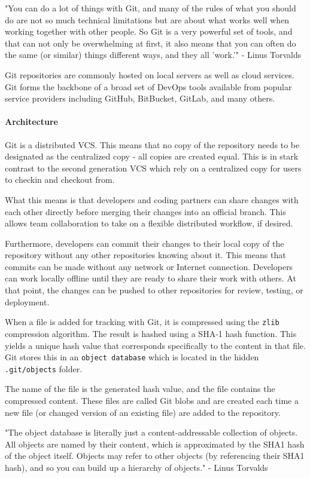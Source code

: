 "You can do a lot of things with Git, and many of the rules of what you should do are not so much technical limitations but are about what works well when working together with other people. So Git is a very powerful set of tools, and that can not only be overwhelming at first, it also means that you can often do the same (or similar) things different ways, and they all 'work.'" - Linus Torvalds

Git repositories are commonly hosted on local servers as well as cloud services. Git forms the backbone of a broad set of DevOps tools available from popular service providers including GitHub, BitBucket, GitLab, and many others.
\paragraph{Architecture}
Git is a distributed VCS. This means that no copy of the repository needs to be designated as the centralized copy - all copies are created equal. This is in stark contrast to the second generation VCS which rely on a centralized copy for users to checkin and checkout from.

What this means is that developers and coding partners can share changes with each other directly before merging their changes into an official branch. This allows team collaboration to take on a flexible distributed workflow, if desired.

Furthermore, developers can commit their changes to their local copy of the repository without any other repositories knowing about it. This means that commits can be made without any network or Internet connection. Developers can work locally offline until they are ready to share their work with others. At that point, the changes can be pushed to other repositories for review, testing, or deployment.

When a file is added for tracking with Git, it is compressed using the \lstinline{zlib} compression algorithm. The result is hashed using a SHA-1 hash function. This yields a unique hash value that corresponds specifically to the content in that file. Git stores this in an \lstinline{object database} which is located in the hidden \lstinline{.git/objects} folder.

The name of the file is the generated hash value, and the file contains the compressed content. These files are called Git blobs and are created each time a new file (or changed version of an existing file) are added to the repository.

"The object database is literally just a content-addressable collection of objects. All objects are named by their content, which is approximated by the SHA1 hash of the object itself. Objects may refer to other objects (by referencing their SHA1 hash), and so you can build up a hierarchy of objects." - Linus Torvalds

